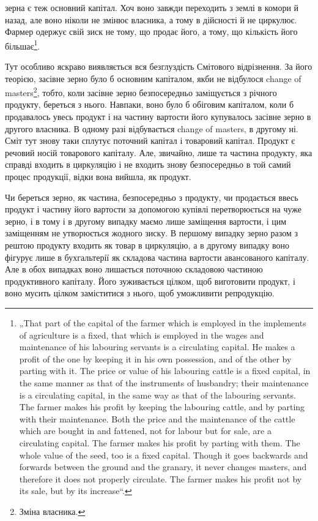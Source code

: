 зерна є теж основний капітал. Хоч воно завжди переходить з землі
в комори й назад, але воно ніколи не змінює власника, а тому в
дійсності й не циркулює. Фармер одержує свій зиск не тому, що продає
його, а тому, що кількість його більшає\footnote*{
„That part of the capital of the farmer which is employed in the implements
of agriculture is a fixed, that which is employed in the wages and maintenance of
his labouring servants is a circulating capital. He makes a profit of the one by
keeping it in his own possession, and of the other by parting with it. The price or
value of his labouring cattle is a fixed capital, in the same manner as that of the
instruments of husbandry; their maintenance is a circulating capital, in the same way
as that of the labouring servants. The farmer makes his profit by keeping the labouring
cattle, and by parting with their maintenance. Both the price and the maintenance
of the cattle which are bought in and fattened, not for labour but for sale,
are a circulating capital. The farmer makes his profit by parting with them. The whole
value of the seed, too is a fixed capital. Though it goes backwards and
forwards between the ground and the granary, it never changes masters, and therefore
it does not properly circulate. The farmer makes his profit not by its sale, but
by its increase“.
}.

Тут особливо яскраво виявляється вся безглуздість Смітового відрізнення.
За його теорією, засівне зерно було б основним капіталом, якби не
відбулося change of masters\footnote*{
Зміна власника. 
}, тобто, коли засівне зерно безпосередньо
заміщується з річного продукту, береться з нього. Навпаки,
воно було б обіговим капіталом, коли б продавалось увесь продукт і на
частину вартости його купувалось засівне зерно в другого власника. В
одному разі відбувається change of masters, в другому ні. Сміт тут знову
таки сплутує поточний капітал і товаровий капітал. Продукт є речовий
носій товарового капіталу. Але, звичайно, лише та частина продукту,
яка справді входить в циркуляцію і не входить знову безпосередньо в
той самий процес продукції, відки вона вийшла, як продукт.

Чи береться зерно, як частина, безпосередньо з продукту, чи продається
ввесь продукт і частину його вартости за допомогою купівлі перетворюється
на чуже зерно, і в тому і в другому випадку маємо лише заміщення
вартости, і цим заміщенням не утворюється жодного зиску. В
першому випадку зерно разом з рештою продукту входить як товар в
циркуляцію, а в другому випадку воно фігурує лише в бухгальтерії як
складова частина вартости авансованого капіталу. Але в обох випадках
воно лишається поточною складовою частиною продуктивного капіталу.
Його зуживається цілком, щоб виготовити продукт, і воно мусить цілком
заміститися з нього, щоб уможливити репродукцію.

